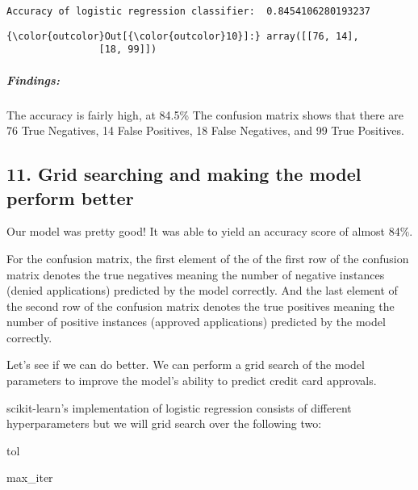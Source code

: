 \documentclass[11pt]{article}
\begin{document}
    \begin{Verbatim}[commandchars=\\\{\}]
Accuracy of logistic regression classifier:  0.8454106280193237

    \end{Verbatim}

\begin{Verbatim}[commandchars=\\\{\}]
{\color{outcolor}Out[{\color{outcolor}10}]:} array([[76, 14],
                [18, 99]])
\end{Verbatim}
            
    \hypertarget{findings}{%
\subparagraph{Findings:}\label{findings}}

The accuracy is fairly high, at 84.5\% The confusion matrix shows that
there are 76 True Negatives, 14 False Positives, 18 False Negatives, and
99 True Positives.

    \hypertarget{grid-searching-and-making-the-model-perform-better}{%
\subsection{11. Grid searching and making the model perform
better}\label{grid-searching-and-making-the-model-perform-better}}

Our model was pretty good! It was able to yield an accuracy score of
almost 84\%.

For the confusion matrix, the first element of the of the first row of
the confusion matrix denotes the true negatives meaning the number of
negative instances (denied applications) predicted by the model
correctly. And the last element of the second row of the confusion
matrix denotes the true positives meaning the number of positive
instances (approved applications) predicted by the model correctly.

Let's see if we can do better. We can perform a grid search of the model
parameters to improve the model's ability to predict credit card
approvals.

scikit-learn's implementation of logistic regression consists of
different hyperparameters but we will grid search over the following
two:

tol

max\_iter
\end{document}
